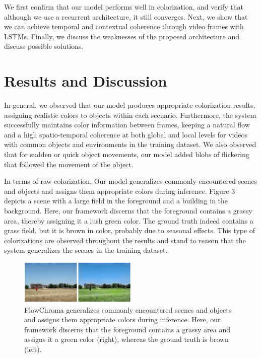 \documentclass[10pt,twocolumn,letterpaper]{article}
\begin{document}
We first confirm that our model performs well in colorization, and verify that although we use a recurrent architecture, it still converges. Next, we show that we can achieve temporal and contextual coherence through video frames with LSTMs. Finally, we discuss the weaknesses of the proposed architecture and discuss possible solutions.

\section{Results and Discussion}
In general, we observed that our model produces appropriate colorization results, assigning realistic colors to objects within each scenario. Furthermore, the system successfully maintains color information between frames, keeping a natural flow and a high spatio-temporal coherence at both global and local levels for videos with common objects and environments in the training dataset. We also observed that for sudden or quick object movements, our model added blobs of flickering that followed the movement of the object.

In terms of raw colorization, Our model generalizes commonly encountered scenes and objects and assigns them appropriate colors during inference. Figure 3 depicts a scene with a large field in the foreground and a building in the background. Here, our framework discerns that the foreground contains a grassy area, thereby assigning it a lush green color. The ground truth indeed contains a grass field, but it is brown in color, probably due to seasonal effects. This type of colorizations are observed throughout the results and stand to reason that the system generalizes the scenes in the training dataset.

\begin{figure}[!h]
  \centering
  \includegraphics[width=0.5\textwidth]{original-fc-grass-building.jpg}
  \caption{FlowChroma generalizes commonly encountered scenes and objects and assigns them appropriate colors during inference. Here, our framework discerns that the foreground contains a grassy area and assigns it a green color (right), whereas the ground truth is brown (left).}
\end{figure}
\end{document}
